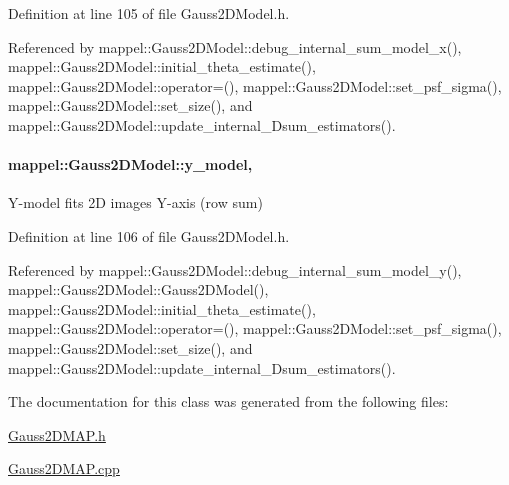 Definition at line 105 of file Gauss2\+D\+Model.\+h.



Referenced by mappel\+::\+Gauss2\+D\+Model\+::debug\+\_\+internal\+\_\+sum\+\_\+model\+\_\+x(), mappel\+::\+Gauss2\+D\+Model\+::initial\+\_\+theta\+\_\+estimate(), mappel\+::\+Gauss2\+D\+Model\+::operator=(), mappel\+::\+Gauss2\+D\+Model\+::set\+\_\+psf\+\_\+sigma(), mappel\+::\+Gauss2\+D\+Model\+::set\+\_\+size(), and mappel\+::\+Gauss2\+D\+Model\+::update\+\_\+internal\+\_\+Dsum\+\_\+estimators().

\paragraph[{\texorpdfstring{y\+\_\+model}{y_model}}]{ mappel\+::\+Gauss2\+D\+Model\+::y\+\_\+model\hspace{0.3cm}{\ttfamily [protected]}, {\ttfamily [inherited]}}\hypertarget{classmappel_1_1Gauss2DModel_ae6b9107d70f810534ad2c65213aae340}{}\label{classmappel_1_1Gauss2DModel_ae6b9107d70f810534ad2c65213aae340}
Y-\/model fits 2D images Y-\/axis (row sum) 

Definition at line 106 of file Gauss2\+D\+Model.\+h.



Referenced by mappel\+::\+Gauss2\+D\+Model\+::debug\+\_\+internal\+\_\+sum\+\_\+model\+\_\+y(), mappel\+::\+Gauss2\+D\+Model\+::\+Gauss2\+D\+Model(), mappel\+::\+Gauss2\+D\+Model\+::initial\+\_\+theta\+\_\+estimate(), mappel\+::\+Gauss2\+D\+Model\+::operator=(), mappel\+::\+Gauss2\+D\+Model\+::set\+\_\+psf\+\_\+sigma(), mappel\+::\+Gauss2\+D\+Model\+::set\+\_\+size(), and mappel\+::\+Gauss2\+D\+Model\+::update\+\_\+internal\+\_\+Dsum\+\_\+estimators().



The documentation for this class was generated from the following files\+:\begin{DoxyCompactItemize}
\item 
\hyperlink{Gauss2DMAP_8h}{Gauss2\+D\+M\+A\+P.\+h}\item 
\hyperlink{Gauss2DMAP_8cpp}{Gauss2\+D\+M\+A\+P.\+cpp}\end{DoxyCompactItemize}
